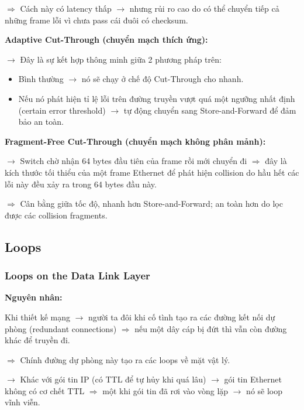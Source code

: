 $\Rightarrow$ Cách này có latency thấp $\rightarrow$ nhưng rủi ro cao do có thể chuyển tiếp cả những frame lỗi vì chưa pass cái đuôi có checksum.
\medskip

\vspace{0.3cm}

\noindent
\textbf{Adaptive Cut-Through (chuyển mạch thích ứng):}
\medskip

\noindent
$\rightarrow$ Đây là sự kết hợp thông minh giữa 2 phương pháp trên:

\begin{itemize}
    \item Bình thường $\rightarrow$ nó sẽ chạy ở chế độ Cut-Through cho nhanh.
    \item[$\Rightarrow$] Nếu nó phát hiện tỉ lệ lỗi trên đường truyền vượt quá một ngưỡng nhất định (certain error threshold) $\rightarrow$ tự động chuyển sang Store-and-Forward để đảm bảo an toàn.
\end{itemize}
\medskip

\pagebreak

\noindent
\textbf{Fragment-Free Cut-Through (chuyển mạch không phân mảnh):}
\medskip

\noindent
$\rightarrow$ Switch chờ nhận 64 bytes đầu tiên của frame rồi mới chuyển đi $\Rightarrow$ đây là kích thước tối thiểu của một frame Ethernet để phát hiện collision do hầu hết các lỗi này đều xảy ra trong 64 bytes đầu này.

$\Rightarrow$ Cân bằng giữa tốc độ, nhanh hơn Store-and-Forward; an toàn hơn do lọc được các collision fragments.
\medskip

\subsection{Loops}

\subsubsection{Loops on the Data Link Layer}

\noindent
\textbf{Nguyên nhân:}
\medskip

\noindent
Khi thiết kế mạng $\rightarrow$ người ta đôi khi cố tình tạo ra các đường kết nối dự phòng (redundant connections) $\Rightarrow$ nếu một dây cáp bị đứt thì vẫn còn đường khác để truyền đi.

$\Rightarrow$ Chính đường dự phòng này tạo ra các loops về mặt vật lý.
\medskip

$\rightarrow$ Khác với gói tin IP (có TTL để tự hủy khi quá lâu) $\rightarrow$ gói tin Ethernet không có cơ chết TTL $\Rightarrow$ một khi gói tin đã rơi vào vòng lặp $\rightarrow$ nó sẽ loop vĩnh viễn.
\medskip

